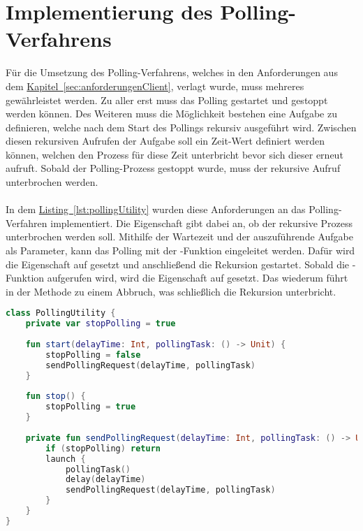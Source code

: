 \section{Implementierung des Polling-Verfahrens}\label{sec:polling}
Für die Umsetzung des Polling-Verfahrens, welches in den Anforderungen aus dem \hyperref[sec:anforderungenClient]{Kapitel~\ref{sec:anforderungenClient}}, verlagt wurde, muss mehreres gewährleistet werden. Zu aller erst muss das Polling gestartet und gestoppt werden können. Des Weiteren muss die Möglichkeit bestehen eine Aufgabe zu definieren, welche nach dem Start des Pollings rekursiv ausgeführt wird. Zwischen diesen rekursiven Aufrufen der Aufgabe soll ein Zeit-Wert definiert werden können, welchen den Prozess für diese Zeit unterbricht bevor sich dieser erneut aufruft. Sobald der Polling-Prozess gestoppt wurde, muss der rekursive Aufruf unterbrochen werden.\\
\\
In dem \hyperref[lst:pollingUtility]{Listing~\ref{lst:pollingUtility}} wurden diese Anforderungen an das Polling-Verfahren implementiert. Die Eigenschaft  gibt dabei an, ob der rekursive Prozess unterbrochen werden soll. Mithilfe der Wartezeit und der auszuführende Aufgabe als Parameter, kann das Polling mit der -Funktion eingeleitet werden. Dafür wird die Eigenschaft  auf  gesetzt und anschließend die Rekursion gestartet. Sobald die -Funktion aufgerufen wird, wird die Eigenschaft  auf  gesetzt. Das wiederum führt in der Methode  zu einem Abbruch, was schließlich die Rekursion unterbricht.\\
\begin{lstlisting}[style=lstStyleFramed, language=Kotlin, caption={Implementierung der Klasse \code{PollingUtility} für die Umsetzung des Polling-Verfahrens}, label=lst:pollingUtility, float]
class PollingUtility {
	private var stopPolling = true
	
	fun start(delayTime: Int, pollingTask: () -> Unit) {
		stopPolling = false
		sendPollingRequest(delayTime, pollingTask)
	}
	
	fun stop() {
		stopPolling = true
	}
	
	private fun sendPollingRequest(delayTime: Int, pollingTask: () -> Unit) {
		if (stopPolling) return
		launch {
			pollingTask()
			delay(delayTime)
			sendPollingRequest(delayTime, pollingTask)
		}
	}
}
\end{lstlisting}
\\
